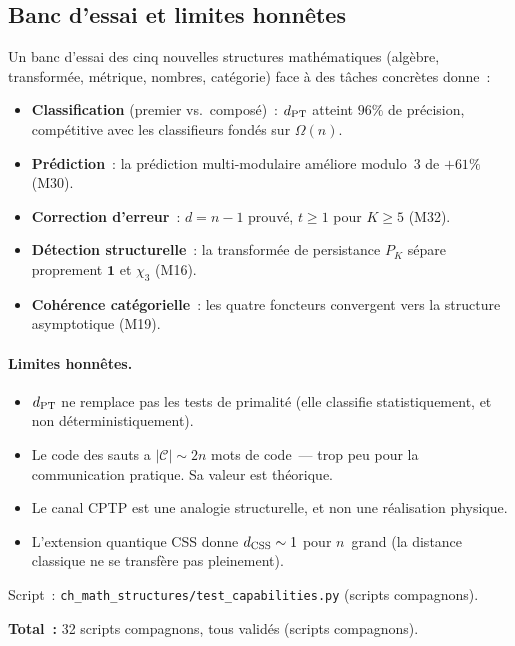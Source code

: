 \documentclass[12pt,a4paper]{article}
\begin{document}
\subsection{Banc d'essai et limites honnêtes}
\label{sec:ms_benchmark}

Un banc d'essai des cinq nouvelles structures mathématiques (algèbre,
transformée, métrique, nombres, catégorie) face à des tâches
concrètes donne~:

\begin{itemize}[nosep]
\item \textbf{Classification} (premier vs.\ composé)~: $d_{\rm PT}$
  atteint $96\%$ de précision, compétitive avec les classifieurs
  fondés sur $\Omega(n)$.
\item \textbf{Prédiction}~: la prédiction multi-modulaire améliore
  modulo~3 de $+61\%$ (M30).
\item \textbf{Correction d'erreur}~: $d = n-1$ prouvé, $t \geq 1$
  pour $K \geq 5$ (M32).
\item \textbf{Détection structurelle}~: la transformée de persistance
  $P_K$ sépare proprement $\mathbf{1}$ et $\chi_3$ (M16).
\item \textbf{Cohérence catégorielle}~: les quatre foncteurs
  convergent vers la structure asymptotique (M19).
\end{itemize}

\paragraph{Limites honnêtes.}
\begin{itemize}[nosep]
\item $d_{\rm PT}$ ne remplace pas les tests de primalité (elle
  classifie statistiquement, et non déterministiquement).
\item Le code des sauts a $|\mathcal{C}| \sim 2n$ mots de code~--- trop
  peu pour la communication pratique. Sa valeur est théorique.
\item Le canal CPTP est une analogie structurelle, et non une
  réalisation physique.
\item L'extension quantique CSS donne $d_{\rm CSS} \sim 1$ pour
  $n$~grand (la distance classique ne se transfère pas pleinement).
\end{itemize}

Script~: \texttt{ch\_math\_structures/test\_capabilities.py}
(scripts compagnons).

\medskip
\noindent\textbf{Total~:} 32 scripts compagnons, tous validés
(scripts compagnons).
\end{document}
